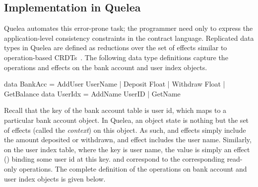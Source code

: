 \subsection{Implementation in Quelea}

Quelea automates this error-prone task; the programmer need only to express the
application-level consistency constraints in the contract language. Replicated
data types in Quelea are defined as reductions over the set of effects similar
to operation-based CRDTs~\cite{}. The following data type definitions capture
the operations and effects on the bank account and user index objects.

\begin{codehaskell}
data BankAcc = AddUser UserName | Deposit Float
             | Withdraw Float | GetBalance
data UserIdx = AddName UserID | GetName
\end{codehaskell}

Recall that the key of the bank account table is user id, which maps to a
particular bank account object. In Quelea, an object state is nothing but the
set of effects (called the \emph{context}) on this object. As such,
 and  effects simply include the amount deposited or
withdrawn, and  effect includes the user name. Similarly, on the
user index table, where the key is user name, the value is simply an effect
() binding some user id at this key.  and
 correspond to the corresponding read-only operations. The complete
definition of the operations on bank account and user index objects is given
below.


